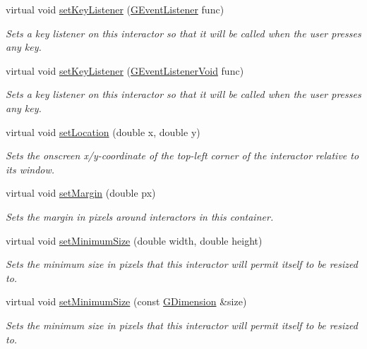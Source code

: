 \begin{DoxyCompactItemize}
virtual void \mbox{\hyperlink{classsgl_1_1GInteractor_aeb8324d3287fa1fbe093f4d6230cf0a6}{set\+Key\+Listener}} (\mbox{\hyperlink{namespacesgl_ae9f3e9eab70035da1a2b114e21357b25}{G\+Event\+Listener}} func)
\begin{DoxyCompactList}\small\item\em Sets a key listener on this interactor so that it will be called when the user presses any key. \end{DoxyCompactList}\item 
virtual void \mbox{\hyperlink{classsgl_1_1GInteractor_ae48ecea73606c7bd9423e1c7cc589cc9}{set\+Key\+Listener}} (\mbox{\hyperlink{namespacesgl_a54427ce97bb1c2804e4fe2b0a62e8b17}{G\+Event\+Listener\+Void}} func)
\begin{DoxyCompactList}\small\item\em Sets a key listener on this interactor so that it will be called when the user presses any key. \end{DoxyCompactList}\item 
virtual void \mbox{\hyperlink{classsgl_1_1GInteractor_a04594e8ba9b98513a64f1da00dcae18c}{set\+Location}} (double x, double y)
\begin{DoxyCompactList}\small\item\em Sets the onscreen x/y-\/coordinate of the top-\/left corner of the interactor relative to its window. \end{DoxyCompactList}\item 
virtual void \mbox{\hyperlink{classsgl_1_1GContainer_a79b7a5ffc0a63c8f11be4ed59808f60d}{set\+Margin}} (double px)
\begin{DoxyCompactList}\small\item\em Sets the margin in pixels around interactors in this container. \end{DoxyCompactList}\item 
virtual void \mbox{\hyperlink{classsgl_1_1GInteractor_a0cf428e207b7f22cc08138a90b1b87b2}{set\+Minimum\+Size}} (double width, double height)
\begin{DoxyCompactList}\small\item\em Sets the minimum size in pixels that this interactor will permit itself to be resized to. \end{DoxyCompactList}\item 
virtual void \mbox{\hyperlink{classsgl_1_1GInteractor_a3b1046117ac6cb7abe467e00ba8a81f4}{set\+Minimum\+Size}} (const \mbox{\hyperlink{structsgl_1_1GDimension}{G\+Dimension}} \&size)
\begin{DoxyCompactList}\small\item\em Sets the minimum size in pixels that this interactor will permit itself to be resized to. \end{DoxyCompactList}\item 

\end{DoxyCompactItemize}

